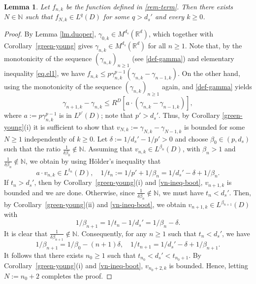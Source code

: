 \documentclass[11pt,a4paper,reqno]{amsart}
\newtheorem{lemma}[theorem]{\bf Lemma}
\theoremstyle{definition}
\numberwithin{equation}{section}
\begin{document}
\begin{lemma}\label{lemma-regular}
Let $f_{n,k}$ be the function defined in \eqref{rem-term}.
Then there exists $N\in\mathbb{N}$ such that $f_{N,k}\in L^{q}(D)$ for some $q>d_s'$ and every  $k\ge 0$.
\end{lemma}
 
\begin{proof}
By Lemma \ref{lm.duoper}, $\gamma_{0,k}\in M^{{d_s}}(\mathbb R^d)$, which together with 
Corollary~\ref{green-young} gives $\gamma_{n,k}\in M^{{d_s}}(\mathbb R^d)$ for all $n\ge 1$.
 Note that, by the monotonicity of the sequence $(\gamma_{n,k})_{n\ge 1}$ (see \eqref{def-gamma})
 and elementary inequality \eqref{eq.el1}, we have 
$f_{n,k}\leq p\gamma_{n,k}^{p-1}(\gamma_{n,k}-\gamma_{n-1,k})$. On the other hand, using the monotonicity of the sequence 
$(\gamma_{n,k})_{n\ge 1}$ again, and  \eqref{def-gamma} yields 
 \begin{equation}\label{vn-ineq-boot}
\gamma_{n+1,k}-\gamma_{n,k}\le R^{D}[a\cdot (\gamma_{n,k}-\gamma_{n-1,k})],
 \end{equation}
 where $a:=p\gamma_{n,k}^{p-1}$ is in $L^{p'}(D)$; note that   $p'>d_s'$. 
 Thus, by Corollary  \ref{green-young}(i) it is sufficient to show that $v_{N,k}:=\gamma_{N,k}-\gamma_{N-1,k}$ is bounded for some $N\ge 1$
 independently of $k\ge 0$.
 Let $\delta:=1/d_s'-1/p'>0$ and choose $\beta_0\in(p,{d_s})$  such that the ratio $\frac{1}{\delta\beta_0}\notin\mathbb N$.
 Assuming that $v_{n,k}\in L^{\beta_n}(D)$, with $\beta_n>1$ and  $\frac{1}{\delta\beta_n}\notin\mathbb N$,
 we obtain by using  H\"older's inequality that
 \[
 a\cdot v_{n,k}\in L^{t_n}(D), \quad 1/t_n:=1/p'+1/\beta_n=1/d_s'-\delta+1/\beta_n.
 \]
 If $t_n>d_s'$, then by Corollary~\ref{green-young}(i) and \eqref{vn-ineq-boot}, $v_{n+1,k}$ is bounded and   we are done. 
 Otherwise,  since $\frac{1}{\delta\beta_n}\notin\mathbb N$, we must have $t_n<d_s'$.
 Then, by Corollary~\ref{green-young}(ii) and \eqref{vn-ineq-boot}, we obtain $v_{n+1,k}\in L^{\beta_{n+1}}(D)$ with
 \[
 1/\beta_{n+1}=1/t_n-1/d_s'=1/\beta_n-\delta.
 \]
 It is clear that $\frac{1}{\delta\beta_{n+1}}\notin\mathbb N$.
 Consequently, for any $n\ge 1$ such that $t_n<d_s'$, we have 
 \[
 1/\beta_{n+1}=1/\beta_0-(n+1)\delta,\quad 1/t_{n+1}=1/d_s'-\delta+1/\beta_{n+1}.
 \]
 It follows that   there exists $n_0\ge 1$ such that  $t_{n_0}<d_s'<t_{n_0+1}$.
 By Corollary~\ref{green-young}(i) and \eqref{vn-ineq-boot}, $v_{n_0+2,k}$ is bounded.   Hence, letting $N:=n_0+2$ completes the proof.
\end{proof}
\end{document}
